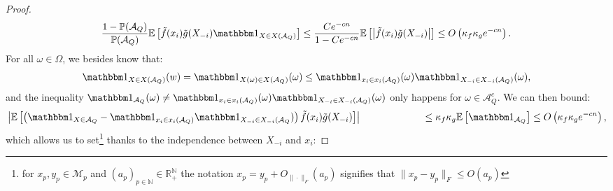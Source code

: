 \documentclass[a4papaer, titlepage]{book}
\begin{document}
\begin{proof}
  \begin{align*}
    \frac{1 - \mathbb P(\mathcal A_Q)}{\mathbb P(\mathcal A_Q)}\mathbb E \left[ \tilde f(x_i) \tilde g(X_{-i}) \un_{X \in X(\mathcal A_Q)} \right] \leq \frac{C e^{-cn}}{1 - C e^{-cn}} \mathbb E \left[ \left\vert \tilde f(x_i) \tilde g(X_{-i}) \right\vert\right] \leq O \left( \kappa_f \kappa_g e^{-cn} \right).
  \end{align*}
  For all $\omega \in \Omega$, we besides know that:
  \begin{align*}
     \un_{X \in X(\mathcal A_Q)}(w) = \un_{X(\omega) \in X(\mathcal A_Q)}(\omega) \leq \un_{x_i \in x_i(\mathcal A_Q)}(\omega) \un_{X_{-i} \in X_{-i}(\mathcal A_Q)}(\omega),
   \end{align*}
   and the inequality $\un_{\mathcal A_Q}(\omega) \neq \un_{x_i \in x_i(\mathcal A_Q)}(\omega) \un_{X_{-i} \in X_{-i}(\mathcal A_Q)}(\omega)$ only happens for $\omega \in \mathcal A_Q^c$. 
  We can then bound:
  \begin{align*}
    &\left\vert \mathbb E \left[ \left( \un_{X \in \mathcal A_Q} - \un_{x_i \in x_i(\mathcal A_Q)} \un_{X_{-i} \in X_{-i}(\mathcal A_Q}) \right) \tilde f(x_i) \tilde g(X_{-i})\right] \right\vert
    &\hspace{2cm}\leq \kappa_f \kappa_g \mathbb E \left[  \un_{\mathcal A_Q} \right] 
    \leq O \left( \kappa_f \kappa_g e^{-cn} \right),
  \end{align*}
  which allows us to set\footnote{for $x_p,y_p \in \mathcal M_{p}$ and $(a_p)_{p \in \mathbb N} \in \mathbb R_+^{\mathbb N}$ the notation $x_p = y_p + O_{\|\cdot \|_F}(a_p)$ signifies that $\|x_p - y_p \|_F \leq O(a_p)$} thanks to the independence between $X_{-i}$ and $x_i$:

\end{proof}
\end{document}

